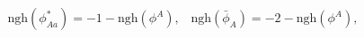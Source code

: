 \begin{equation*}
\mathrm{ngh}(\phi _{Aa}^{\ast })=-1-\mathrm{ngh}(\phi ^{A}),\;\;\;\mathrm{ngh%
}(\bar{\phi}_{A})=-2-\mathrm{ngh}(\phi ^{A}),
\end{equation*}

